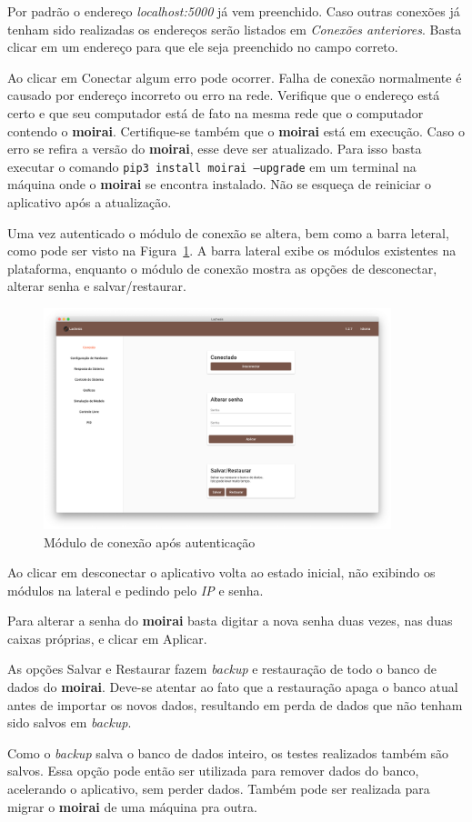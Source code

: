 Por padrão o endereço \textit{localhost:5000} já vem preenchido. Caso outras
conexões já tenham sido realizadas os endereços serão listados em
\textit{Conexões anteriores}. Basta clicar em um endereço para que ele seja
preenchido no campo correto.

Ao clicar em Conectar algum erro pode ocorrer. Falha de conexão normalmente é
causado por endereço incorreto ou erro na rede. Verifique que o endereço está
certo e que seu computador está de fato na mesma rede que o computador contendo
o \textbf{moirai}. Certifique-se também que o \textbf{moirai} está em execução.
Caso o erro se refira a versão do \textbf{moirai}, esse deve ser atualizado.
Para isso basta executar o comando \texttt{pip3 install moirai
--upgrade} em um terminal na máquina onde o \textbf{moirai} se encontra
instalado. Não se esqueça de reiniciar o aplicativo após a atualização.

Uma vez autenticado o módulo de conexão se altera, bem como a barra leteral,
como pode ser visto na Figura~\ref{fig:connection-screen}. A barra lateral exibe
os módulos existentes na plataforma, enquanto o módulo de conexão mostra as
opções de desconectar, alterar senha e salvar/restaurar.

\begin{figure}[ht!]
    \centering
    \includegraphics[width=0.9\textwidth]{imgs/connection-screen}
    \caption[Módulo de conexão após autenticação]{Módulo de conexão após autenticação}%
    \label{fig:connection-screen}
\end{figure}

Ao clicar em desconectar o aplicativo volta ao estado inicial, não exibindo os
módulos na lateral e pedindo pelo \textit{IP} e senha.

Para alterar a senha do \textbf{moirai} basta digitar a nova senha duas vezes,
nas duas caixas próprias, e clicar em Aplicar.

As opções Salvar e Restaurar fazem \textit{backup} e restauração de todo o banco
de dados do \textbf{moirai}. Deve-se atentar ao fato que a restauração apaga o
banco atual antes de importar os novos dados, resultando em perda de dados que
não tenham sido salvos em \textit{backup}.

Como o \textit{backup} salva o banco de dados inteiro, os testes realizados
também são salvos. Essa opção pode então ser utilizada para remover dados do
banco, acelerando o aplicativo, sem perder dados. Também pode ser realizada para
migrar o \textbf{moirai} de uma máquina pra outra.
